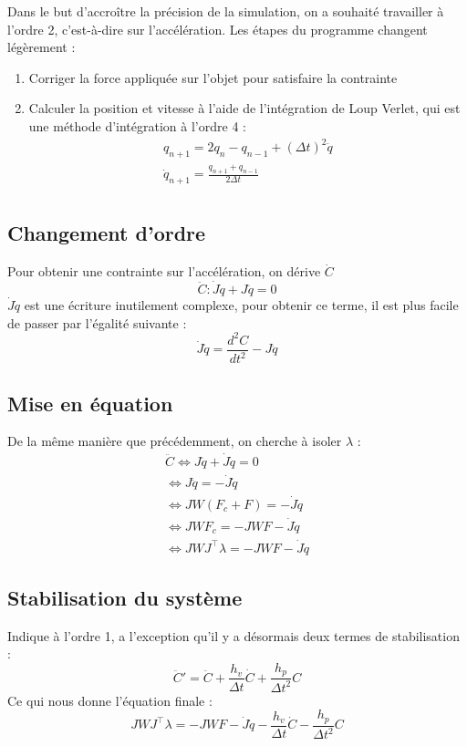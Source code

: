 Dans le but d'accroître la précision de la simulation, on a souhaité travailler à l'ordre 2, c'est-à-dire sur l'accélération.
Les étapes du programme changent légèrement :
\begin{enumerate}
    \item Corriger la force appliquée sur l'objet pour satisfaire la contrainte
    \item Calculer la position et vitesse à l'aide de l'intégration de Loup Verlet, qui est une méthode d'intégration à l'ordre 4 :
    \begin{gather*}
        q_{n + 1} = 2 q_n - q_{n - 1} + (\Delta t)^2 \ddot{q}\\
        \dot{q}_{n + 1} =  \frac{q_{n + 1} + q_{n - 1}}{2\Delta t}\\
    \end{gather*}
\end{enumerate}
\subsection{Changement d'ordre}\label{subsec:changement-d'ordre-acceleration}
Pour obtenir une contrainte sur l'accélération, on dérive $\dot{C}$
\[\ddot{C} : \dot{J}\dot{q} + J\ddot{q} = 0\]
$\dot{J}\dot{q}$ est une écriture inutilement complexe, pour obtenir ce terme, il est plus facile de passer par l'égalité suivante :
\[\dot{J}\dot{q} = \frac{d^2 C}{dt^2} - J\ddot{q}\]

\subsection{Mise en équation}\label{subsec:mise-en-equation-acceleration}
De la même manière que précédemment, on cherche à isoler $\lambda$ :
\begin{gather*}
    \ddot{C} \Leftrightarrow J\ddot{q} + \dot{J}\dot{q} = 0\\
    \Leftrightarrow J\ddot{q} = -\dot{J}\dot{q}\\
    \Leftrightarrow J W (F_c + F) = -\dot{J}\dot{q}\\
    \Leftrightarrow J W F_c = -JWF -\dot{J}\dot{q}\\
    \Leftrightarrow J W J^\intercal \lambda = -JWF -\dot{J}\dot{q}
\end{gather*}

\subsection{Stabilisation du système}\label{subsec:stabilisation-du-systeme-acceleration}
Indique à l'ordre 1, a l'exception qu'il y a désormais deux termes de stabilisation :
\[\ddot{C}' = \ddot{C} + \frac{h_v}{\Delta t} \dot{C} + \frac{h_p}{\Delta t^2} C\]
Ce qui nous donne l'équation finale :
\[\boxed{J W J^\intercal \lambda = -JWF -\dot{J}\dot{q} - \frac{h_v}{\Delta t} \dot{C} - \frac{h_p}{\Delta t^2} C}\]

